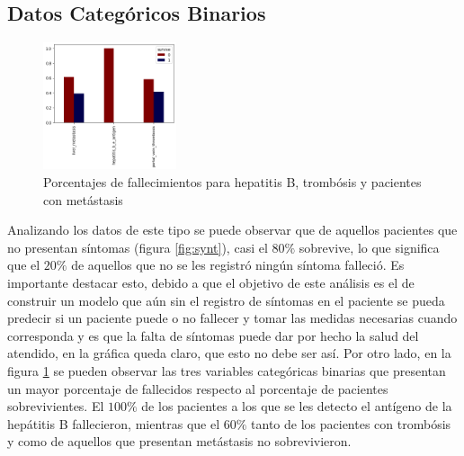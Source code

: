 \documentclass[6pt, twocolumn]{article}
\begin{document}
\subsection{Datos Categóricos Binarios}
\begin{figure}
\centering
\includegraphics[width = 0.35\textwidth]{./nominal.png}
\caption{\footnotesize \label{fig:nom}Porcentajes de fallecimientos para hepatitis B, trombósis y pacientes con metástasis}
\end{figure}
Analizando los datos de este tipo se puede observar que de aquellos pacientes que no presentan síntomas (figura \ref{fig:synt}), casi el $80\%$ sobrevive,  lo que significa que el $20\%$ de aquellos que no se les registró ningún síntoma falleció. Es  importante destacar esto, debido a que el objetivo de este análisis es el de construir un modelo que aún sin el registro de síntomas en el paciente se pueda predecir si un paciente puede o no fallecer y tomar las medidas necesarias cuando corresponda y es que la falta de síntomas puede dar por hecho la salud del atendido, en la gráfica queda claro, que esto no debe ser así.
Por otro lado, en la figura \ref{fig:nom} se pueden observar las tres variables categóricas binarias que presentan un mayor porcentaje de fallecidos respecto al porcentaje de pacientes sobrevivientes. El $100\%$ de los pacientes a los que se les detecto el antígeno de la hepátitis B fallecieron, mientras que el $60\%$ tanto de los pacientes con trombósis y como de aquellos que presentan metástasis no sobrevivieron.
\end{document}
